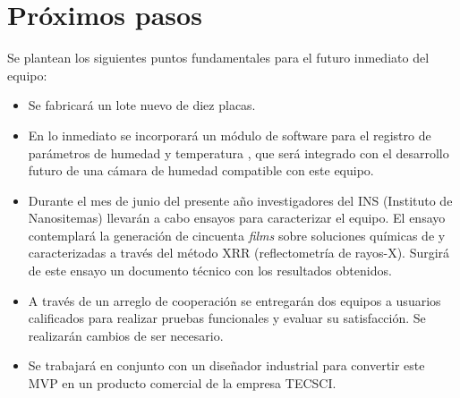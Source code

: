 \section{Próximos pasos}

Se plantean los siguientes puntos fundamentales para el futuro inmediato del equipo:  

\begin{itemize}

\item Se fabricará un lote nuevo de diez placas. 

\item En lo inmediato se incorporará un módulo de software para el registro de parámetros de humedad y temperatura , que será integrado con el desarrollo futuro de una cámara de humedad compatible con este equipo.

\item Durante el mes de junio del presente año investigadores del INS (Instituto de Nanositemas) llevarán a cabo ensayos para caracterizar el equipo. El ensayo contemplará la generación de cincuenta \textit{films} sobre soluciones químicas de  y  caracterizadas a través del método XRR (reflectometría de rayos-X). Surgirá de este ensayo un documento técnico con los resultados obtenidos.  
 
\item A través de un arreglo de cooperación se entregarán dos equipos a usuarios calificados para realizar pruebas funcionales y evaluar su satisfacción. Se realizarán cambios de ser necesario.


\item Se trabajará en conjunto con un diseñador industrial para convertir este MVP en un producto comercial de la empresa TECSCI.

\end{itemize}


